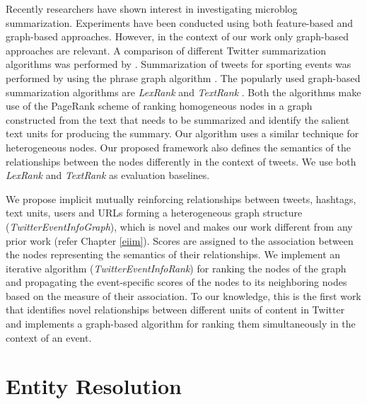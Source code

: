 Recently researchers have shown interest in investigating microblog summarization. Experiments have been conducted using both feature-based and graph-based approaches. However, in the context of our work only graph-based approaches are relevant. A comparison of different Twitter summarization algorithms was performed by \cite{inouye2011comparing}. Summarization of tweets for sporting events was performed by \cite{nichols2012summarizing} using the phrase graph algorithm \cite{sharifi2010experiments}. The popularly used graph-based summarization algorithms are \textit{LexRank} \cite{erkan2004lexrank} and \textit{TextRank} \cite{mihalcea2004textrank}. Both the algorithms make use of the PageRank scheme of ranking homogeneous nodes in a graph constructed from the text that needs to be summarized and identify the salient text units for producing the summary. Our algorithm uses a similar technique for heterogeneous nodes. Our proposed framework also defines the semantics of the relationships between the nodes differently in the context of tweets. We use both \textit{LexRank} and \textit{TextRank} as evaluation baselines.


We propose implicit mutually reinforcing relationships between tweets, hashtags, text units, users and URLs forming a heterogeneous graph structure (\textit{TwitterEventInfoGraph}), which is novel and makes our work different from any prior work (refer Chapter \ref{eiim}). Scores are assigned to the association between the nodes representing the semantics of their relationships. We implement an iterative algorithm (\textit{TwitterEventInfoRank}) for ranking the nodes of the graph and propagating the event-specific scores of the nodes to its neighboring nodes based on the measure of their association. To our knowledge, this is the first work that identifies novel relationships between different units of content in Twitter and implements a graph-based algorithm for ranking them simultaneously in the context of an event.

\section{Entity Resolution}

